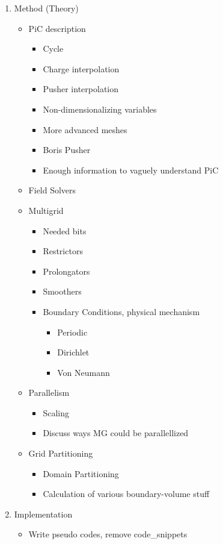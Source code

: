 \begin{enumerate}
    \item Method (Theory)
        \begin{itemize}
            \item PiC description
            \begin{itemize}
                \item Cycle
                \item Charge interpolation
                \item Pusher interpolation
                \item Non-dimensionalizing variables
                \item More advanced meshes
                \item Boris Pusher
                \item Enough information to vaguely understand PiC
            \end{itemize}
            \item Field Solvers
            \item Multigrid
            \begin{itemize}
                \item Needed bits
                \item Restrictors
                \item Prolongators
                \item Smoothers
                \item Boundary Conditions, physical mechanism
                \begin{itemize}
                    \item Periodic
                    \item Dirichlet
                    \item Von Neumann
                \end{itemize}
            \end{itemize}
            \item Parallelism
                \begin{itemize}
                    \item Scaling
                    \item Discuss ways MG could be parallellized
                \end{itemize}
            \item Grid Partitioning
                \begin{itemize}
                    \item Domain Partitioning
                    \item Calculation of various boundary-volume stuff
                \end{itemize}
        \end{itemize}
    \item Implementation
    \begin{itemize}
        \item Write pseudo codes, remove code\_snippets
    \end{itemize}
\end{enumerate}
